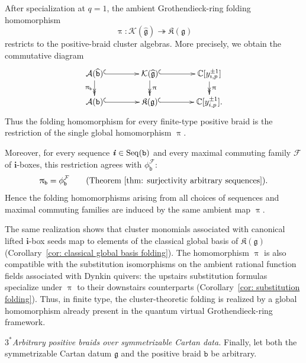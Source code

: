 \documentclass[12pt, leqno]{amsart}
\numberwithin{equation}{section}
\theoremstyle{plain}
\theoremstyle{definition}
\newcommand{\g}{\mathfrak{g}}
\newcommand{\C}{\mathbb{C}}
\newcommand{\im}{\imath}
\newcommand{\ii}{ \textbf{\textit{i}}}
\newcommand{\hg}{{\widehat{\g}}}
\newcommand{\frakK}{\mathfrak{K}}
\newcommand{\bfi}{\mathbf{i}}
\newcommand{\calA}{\mathcal{A}}
\newcommand{\calF}{\mathcal{F}}
\newcommand{\calK}{\mathcal{K}}
\newcommand{\ttb}{\mathtt{b}}
\newcommand{\httb}{\widehat{\ttb}}
\newcommand{\Seq}{\mathrm{Seq}}
\begin{document}
After specialization at $q=1$, the ambient Grothendieck-ring folding
homomorphism
\[
\uppi:\calK(\hg)\twoheadrightarrow\frakK(\g)
\]
restricts to the positive-braid cluster algebras. More precisely, we
obtain the commutative diagram
\[
\xymatrix@C=4em@R=1.5em{
\calA(\httb)
\ar@{^{(}->}[r]
\ar@{->>}[d]_{\uppi_{\ttb}}
&
\calK(\hg)
\ar@{^{(}->}[r]
\ar@{->>}[d]^{\uppi}
&
\C[y_{\im,p}^{\pm1}]
\ar@{->>}[d]^{\uppi}
\\
\calA(\ttb)
\ar@{^{(}->}[r]
&
\frakK(\g)
\ar@{^{(}->}[r]
&
\C[y_{i,p}^{\pm1}].
}
\]
Thus the folding homomorphism for every finite-type positive braid is
the restriction of the single global homomorphism $\uppi$.

Moreover, for every sequence $\ii\in\Seq(\ttb)$ and every maximal
commuting family $\calF$ of $\bfi$-boxes, this restriction agrees with
 $\phi^\calF_\ttb$:
\[
\uppi_\ttb=\phi^\calF_\ttb \qquad\text{(Theorem~\ref{thm: surjectivity arbitrary sequences})}.
\]
Hence the folding homomorphisms arising from all choices of sequences
and maximal commuting families are induced by the same ambient map
$\uppi$.

 The same realization shows that cluster monomials associated with
canonical lifted $\bfi$-box seeds map to elements of the classical global basis of $\frakK(\g)${}
(Corollary~\ref{cor: classical global basis folding}).  The homomorphism $\uppi${} is also compatible with the
substitution isomorphisms  on the ambient rational function fields associated with Dynkin quivers: the upstairs substitution formulas specialize under
$\uppi$ to their downstairs counterparts
(Corollary~\ref{cor: substitution folding}). Thus, in finite type, the
cluster-theoretic folding is realized by a global homomorphism already
present in the quantum virtual Grothendieck-ring framework.

\medskip
\noindent
$\boxed{3}^*$\emph{Arbitrary positive braids over symmetrizable Cartan
data.}
Finally, let both the symmetrizable Cartan datum $\g$ and the positive
braid $\ttb$ be arbitrary. {}
\end{document}
